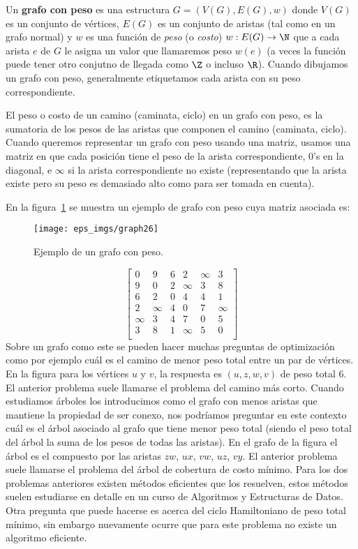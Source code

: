 \begin{definicion}
Un {\bf grafo con peso} es una estructura $G=(V(G),E(G),w)$ donde $V(G)$ es un conjunto de vértices, $E(G)$ es un conjunto de aristas (tal como en un grafo normal) y $w$ es una función de \emph{peso} (o \emph{costo}) $w:E(G)\rightarrow\N$ que a cada arista $e$ de $G$ le asigna un valor que llamaremos peso $w(e)$ (a veces la función puede tener otro conjutno de llegada como $\Z$ o incluso $\R$).
Cuando dibujamos un grafo con peso, generalmente etiquetamos cada arista con su peso correspondiente.

El peso o costo de un camino (caminata, ciclo) en un grafo con peso, es la sumatoria de los pesos de las aristas que componen el camino (caminata, ciclo).
Cuando queremos representar un grafo con peso usando una matriz, usamos una matriz en que cada posición tiene el peso de la arista correspondiente, $0$'s en la diagonal, e $\infty$ si la arista correspondiente no existe (representando que la arista existe pero su peso es demasiado alto como para ser tomada en cuenta).
\end{definicion}

En la figura~\ref{fig:graph26} se muestra un ejemplo de grafo con peso cuya matriz asociada es:
\begin{figure}
\centering
\texttt{[image: eps\_imgs/graph26]}
\caption{Ejemplo de un grafo con peso.}
\label{fig:graph26}
\end{figure}
\[
\left[
\begin{array}{cccccc}
0 & 9 & 6 & 2 & \infty & 3 \\
9 & 0 & 2 & \infty & 3 & 8 \\
6 & 2 & 0 & 4 & 4 & 1 \\
2 & \infty & 4 & 0 & 7 & \infty \\
\infty & 3 & 4 & 7 & 0 & 5 \\
3 & 8 & 1 &\infty & 5 & 0 \\
\end{array}\right]
\]
Sobre un grafo como este se pueden hacer muchas preguntas de optimización como por ejemplo cuál es el camino de menor peso total entre un par de vértices.
En la figura para los vértices $u$ y $v$, la respuesta es $(u,z,w,v)$ de peso total $6$.
El anterior problema suele llamarse el problema del camino más corto.
Cuando estudiamos árboles los introducimos como el grafo con menos aristas que mantiene la propiedad de ser conexo, nos podríamos preguntar en este contexto cuál es el árbol asociado al grafo que tiene menor peso total (siendo el peso total del árbol la suma de los pesos de todas las aristas).
En el grafo de la figura el árbol es el compuesto por las aristas $zw$, $ux$, $vw$, $uz$, $vy$.
El anterior problema suele llamarse el problema del árbol de cobertura de costo mínimo.
Para los dos problemas anteriores existen métodos eficientes que los resuelven, estos métodos suelen estudiarse en detalle en un curso de Algoritmos y Estructuras de Datos.
Otra pregunta que puede hacerse es acerca del ciclo Hamiltoniano de peso total mínimo, sin embargo nuevamente ocurre que para este problema no existe un algoritmo eficiente.

